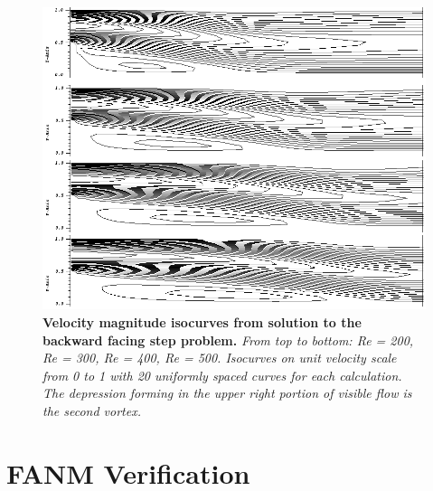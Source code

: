 \begin{figure}[t!]
  \begin{center}
    \includegraphics[width=6in]{chapters/nonlinear_problem/step_velocity_isocurves.png}
  \end{center}
  \caption{\textbf{Velocity magnitude isocurves from solution to the
      backward facing step problem.} \textit{From top to bottom: Re =
      200, Re = 300, Re = 400, Re = 500. Isocurves on unit velocity
      scale from 0 to 1 with 20 uniformly spaced curves for each
      calculation. The depression forming in the upper right portion
      of visible flow is the second vortex.}}
  \label{fig:step_velocity_isocurves}
\end{figure}

\clearpage

\section{FANM Verification\ }
\label{sec:fanm_verification}

